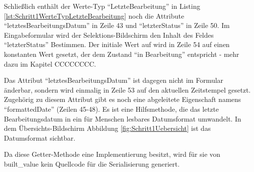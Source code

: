 
Schließlich enthält der Werte-Typ \enquote{LetzteBearbeitung} in Listing \ref{lst:Schritt1WerteTypLetzteBearbeitung} noch die Attribute \enquote{letztesBearbeitungsDatum} in Zeile 43 und \enquote{letzterStatus} in Zeile 50. Im Eingabeformular wird der Selektions-Bildschirm den Inhalt des Feldes \enquote{letzterStatus} Bestimmen. Der initiale Wert auf wird in Zeile 54 auf einen konstanten Wert gesetzt, der dem Zustand \enquote{in Bearbeitung} entspricht - mehr dazu im Kapitel CCCCCCCC.

Das Attribut \enquote{letztesBearbeitungsDatum} ist dagegen nicht im Formular änderbar, sondern wird einmalig in Zeile 53 auf den aktuellen Zeitstempel gesetzt. Zugehörig zu diesem Attribut gibt es noch eine abgeleitete Eigenschaft namens \enquote{formattedDate} (Zeilen 45-48).  Es ist eine Hilfsmethode, die das letzte Bearbeitungsdatum in ein für Menschen lesbares Datumsformat umwandelt. In dem Übersichts-Bildschirm Abbildung \ref{fig:Schritt1Uebersicht} ist das Datumsformat sichtbar.

Da diese Getter-Methode eine Implementierung besitzt, wird für sie von built_value kein Quellcode für die Serialisierung generiert.






